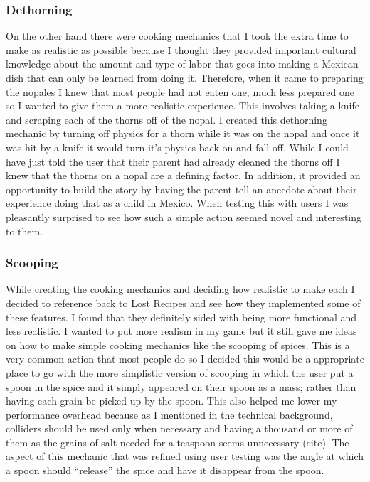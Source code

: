 \documentclass[10pt,twocolumn]{article}
\begin{document}
\subsubsection{Dethorning}
On the other hand there were cooking mechanics that I took the extra time to make as realistic as possible because I thought they provided important cultural knowledge about the amount and type of labor that goes into making a Mexican dish that can only be learned from doing it. Therefore, when it came to preparing the nopales I knew that most people had not eaten one, much less prepared one so I wanted to give them a more realistic experience. This involves taking a knife and scraping each of the thorns off of the nopal. I created this dethorning mechanic by turning off physics for a thorn while it was on the nopal and once it was hit by a knife it would turn it’s physics back on and fall off.  While I could have just told the user that their parent had already cleaned the thorns off I knew that the thorns on a nopal are a defining factor. In addition, it provided an opportunity to build the story by having the parent tell an anecdote about their experience doing that as a child in Mexico. When testing this with users I was pleasantly surprised to see how such a simple action seemed novel and interesting to them.  

\subsubsection{Scooping}
While creating the cooking mechanics and deciding how realistic to make each I decided to reference back to Lost Recipes and see how they implemented some of these features. I found that they definitely sided with being more functional and less realistic. I wanted to put more realism in my game but it still gave me ideas on how to make simple cooking mechanics like the scooping of spices. This is a very common action that most people do so I decided this would be a appropriate place to go with the more simplistic version of scooping in which the user put a spoon in the spice and it simply appeared on their spoon as a mass; rather than having each grain be picked up by the spoon. This also helped me lower my performance overhead because as I mentioned in the technical background, colliders should be used only when necessary and having a thousand or more of them as the grains of salt needed for a teaspoon seems unnecessary (cite). The aspect of this mechanic that was refined using user testing was the angle at which a spoon should “release” the spice and have it disappear from the spoon. 
\end{document}
